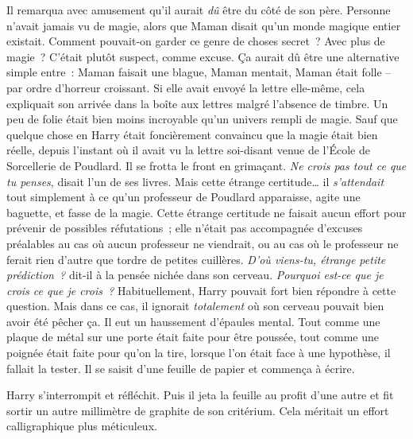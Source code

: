 Il remarqua avec amusement qu'il aurait \emph{dû} être du côté de son père. Personne n'avait jamais vu de magie, alors que Maman disait qu'un monde magique entier existait. Comment pouvait-on garder ce genre de choses secret~? Avec plus de magie~? C'était plutôt suspect, comme excuse.
Ça aurait dû être une alternative simple entre~: Maman faisait une blague, Maman mentait, Maman était folle -- par ordre d'horreur croissant. Si elle avait envoyé la lettre elle-même, cela expliquait son arrivée dans la boîte aux lettres malgré l'absence de timbre. Un peu de folie était bien moins incroyable qu'un univers rempli de magie.
Sauf que quelque chose en Harry était foncièrement convaincu que la magie était bien réelle, depuis l'instant où il avait vu la lettre soi-disant venue de l'École de Sorcellerie de Poudlard.
Il se frotta le front en grimaçant. \emph{Ne crois pas tout ce que tu penses}, disait l'un de ses livres.
Mais cette étrange certitude… il \emph{s'attendait} tout simplement à ce qu'un professeur de Poudlard apparaisse, agite une baguette, et fasse de la magie. Cette étrange certitude ne faisait aucun effort pour prévenir de possibles réfutations~; elle n'était pas accompagnée d'excuses préalables au cas où aucun professeur ne viendrait, ou au cas où le professeur ne ferait rien d'autre que tordre de petites cuillères.
\emph{D'où viens-tu, étrange petite prédiction~?} dit-il à la pensée nichée dans son cerveau. \emph{Pourquoi est-ce que je crois ce que je crois~?}
Habituellement, Harry pouvait fort bien répondre à cette question. Mais dans ce cas, il ignorait \emph{totalement} où son cerveau pouvait bien avoir été pêcher ça.
Il eut un haussement d'épaules mental. Tout comme une plaque de métal sur une porte était faite pour être poussée, tout comme une poignée était faite pour qu'on la tire, lorsque l'on était face à une hypothèse, il fallait la tester.
Il se saisit d'une feuille de papier et commença à écrire.
\begin{writtenNote}
\end{writtenNote}

Harry s'interrompit et réfléchit. Puis il jeta la feuille au profit d'une autre et fit sortir un autre millimètre de graphite de son critérium. Cela méritait un effort calligraphique plus méticuleux.

